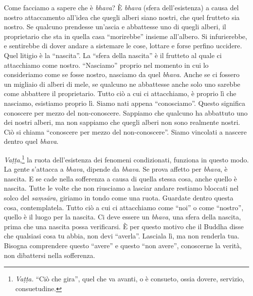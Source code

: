 Come facciamo a sapere che è \emph{bhava}? È \emph{bhava} (sfera
dell'esistenza) a causa del nostro attaccamento all'idea che quegli
alberi siano nostri, che quel frutteto sia nostro. Se qualcuno prendesse
un'ascia e abbattesse uno di quegli alberi, il proprietario che sta in
quella casa ``morirebbe'' insieme all'albero. Si infurierebbe, e
sentirebbe di dover andare a sistemare le cose, lottare e forse perfino
uccidere. Quel litigio è la ``nascita''. La ``sfera della nascita'' è il
frutteto al quale ci attacchiamo come nostro. ``Nasciamo'' proprio nel
momento in cui lo consideriamo come se fosse nostro, nasciamo da quel
\emph{bhava}. Anche se ci fossero un migliaio di alberi di mele, se
qualcuno ne abbattesse anche solo uno sarebbe come abbattere il
proprietario. Tutto ciò a cui ci attacchiamo, è proprio lì che nasciamo,
esistiamo proprio lì. Siamo nati appena ``conosciamo''. Questo significa
conoscere per mezzo del non-conoscere. Sappiamo che qualcuno ha
abbattuto uno dei nostri alberi, ma non sappiamo che quegli alberi non
sono realmente nostri. Ciò si chiama ``conoscere per mezzo del
non-conoscere''. Siamo vincolati a nascere dentro quel \emph{bhava}.

\emph{Vaṭṭa},\footnote{\emph{Vaṭṭa.} ``Ciò che gira'', quel che va avanti, o è consueto,
  ossia dovere, servizio, consuetudine.}
la ruota dell'esistenza dei fenomeni condizionati,
funziona in questo modo. La gente s'attacca a \emph{bhava}, dipende da
\emph{bhava}. Se prova affetto per \emph{bhava}, è nascita. E se cade
nella sofferenza a causa di quella stessa cosa, anche quello è nascita.
Tutte le volte che non riusciamo a lasciar andare restiamo bloccati nel
solco del \emph{saṃsāra}, giriamo in tondo come una ruota. Guardate
dentro questa cosa, contemplatela. Tutto ciò a cui ci attacchiamo come
``noi'' o come ``nostro'', quello è il luogo per la nascita. Ci deve
essere un \emph{bhava}, una sfera della nascita, prima che una nascita
possa verificarsi. È per questo motivo che il Buddha disse che qualsiasi
cosa tu abbia, non devi ``averla''. Lasciala lì, ma non renderla tua.
Bisogna comprendere questo ``avere'' e questo ``non avere'', conoscerne
la verità, non dibattersi nella sofferenza.

